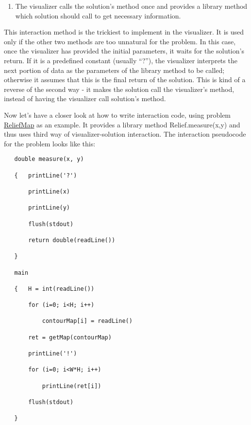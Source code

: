 \begin{enumerate}
\def\labelenumi{\arabic{enumi}.}
\setcounter{enumi}{2}
\tightlist
\item
  The visualizer calls the solution's method once and provides a library
  method which solution should call to get necessary information.
\end{enumerate}

This interaction method is the trickiest to implement in the visualizer.
It is used only if the other two methods are too unnatural for the
problem. In this case, once the visualizer has provided the initial
parameters, it waits for the solution's return. If it is a predefined
constant (usually ``?''), the visualizer interprets the next portion of
data as the parameters of the library method to be called; otherwise it
assumes that this is the final return of the solution. This is kind of a
reverse of the second way - it makes the solution call the visualizer's
method, instead of having the visualizer call solution's method.

Now let's have a closer look at how to write interaction code, using
problem
\href{http://www.topcoder.com/longcontest/?module=ViewProblemStatement\&rd=13766\&pm=10322}{ReliefMap}
as an example. It provides a library method Relief.measure(x,y) and thus
uses third way of visualizer-solution interaction. The interaction
pseudocode for the problem looks like this:

\begin{verbatim}
   double measure(x, y)

   {   printLine('?')

       printLine(x)

       printLine(y)

       flush(stdout)

       return double(readLine())

   }

   main

   {   H = int(readLine())

       for (i=0; i<H; i++)

           contourMap[i] = readLine()

       ret = getMap(contourMap)

       printLine('!')

       for (i=0; i<W*H; i++)

           printLine(ret[i])

       flush(stdout)

   }
\end{verbatim}

